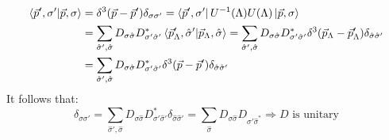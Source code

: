 \documentclass[../main.tex]{subfiles}
\begin{document}
\begin{align*}
\bra{\vec{p}',\sigma'}\ket{\vec{p},\sigma}&=\delta^3(\vec{p}-\vec{p}')\delta_{\sigma\sigma'}=\bra{\vec{p}',\sigma'}U^{-1}(\Lambda)U(\Lambda)\ket{\vec{p},\sigma}\\
&=\sum_{\hat{\sigma}',\hat{\sigma}}D_{\sigma\hat{\sigma}}D_{\sigma'\hat{\sigma}'}^*\bra{\vec{p}'_{\Lambda},\hat{\sigma}'}\ket{\vec{p}_\Lambda,\hat{\sigma}}=\sum_{\hat{\sigma}',\hat{\sigma}}D_{\sigma\hat{\sigma}}D_{\sigma'\hat{\sigma}'}^*\delta^3(\vec{p}_\Lambda-\vec{p}'_{\Lambda})\delta_{\hat{\sigma}\hat{\sigma}'}\\
&=\sum_{\hat{\sigma}',\hat{\sigma}}D_{\sigma\hat{\sigma}}D_{\sigma'\hat{\sigma}'}^*\delta^3(\vec{p}-\vec{p}')\delta_{\hat{\sigma}\hat{\sigma}'}
\end{align*}
It follows that:
\[
\delta_{\sigma\sigma'}=\sum_{\hat{\sigma}',\hat{\sigma}}D_{\sigma\hat{\sigma}}D_{\sigma'\hat{\sigma}'}^*\delta_{\hat{\sigma}\hat{\sigma}'}=\sum_{\hat{\sigma}}D_{\sigma\hat{\sigma}}D_{\sigma'\hat{\sigma}^*}\Rightarrow\text{$D$ is unitary}
\]
\end{document}

